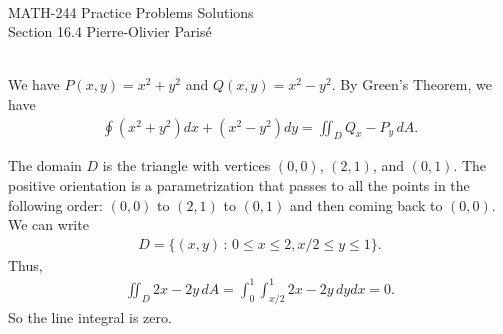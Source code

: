 


	\noindent \hrulefill \\
	MATH-244 \semester \hfill Practice Problems Solutions\\
	Section 16.4 \hfill Pierre-Olivier Paris{\'e} \\\vspace*{-1cm}
	
	\noindent\hrulefill
	
	\spc	

	\\
	We have $P(x, y) = x^2 + y^2$ and $Q(x, y) = x^2 - y^2$. By Green's Theorem, we have
		\begin{align*}
		\oint (x^2 + y^2 ) dx + (x^2 - y^2 ) dy = \iint_D Q_x - P_y \, dA .
		\end{align*}
		
	The domain $D$ is the triangle with vertices $(0, 0)$, $(2, 1)$, and $(0, 1)$. The positive orientation is a parametrization that passes to all the points in the following order: $(0, 0)$ to $(2, 1)$ to $(0, 1)$ and then coming back to $(0, 0)$. We can write
		\begin{align*}
		D = \{ (x, y) \, : \, 0 \leq x \leq 2 , x/2 \leq y \leq 1 \} .
		\end{align*}
	Thus, 
		\begin{align*}
		\iint_D 2x - 2y \, dA = \int_0^1 \int_{x/2}^1 2x - 2y \, dy dx = 0 .
		\end{align*}
	So the line integral is zero.
	
	\spc
	
